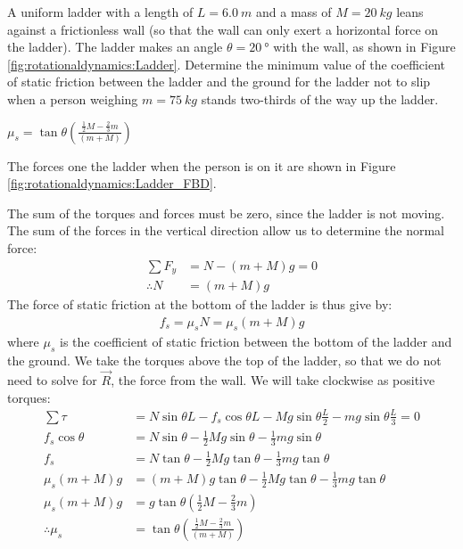 \question A uniform ladder with a length of $L=\SI{6.0}{m}$ and a mass of $M=\SI{20}{kg}$ leans against a frictionless wall (so that the wall can only exert a horizontal force on the ladder). The ladder makes an angle $\theta=\SI{20}{\degree}$ with the wall, as shown in Figure \ref{fig:rotationaldynamics:Ladder}. Determine the minimum value of the coefficient of static friction between the ladder and the ground for the ladder not to slip when a person weighing $m=\SI{75}{kg}$ stands two-thirds of the way up the ladder.
\begin{finalanswer}
$\mu_s =\tan\theta\left(\frac{\frac{1}{2}M-\frac{2}{3}m}{(m+M)}  \right)$
\end{finalanswer}
\begin{solution}
The forces one the ladder when the person is on it are shown in Figure \ref{fig:rotationaldynamics:Ladder_FBD}.

The sum of the torques and forces must be zero, since the ladder is not moving. The sum of the forces in the vertical direction allow us to determine the normal force:
\begin{align*}
\sum F_y&=N-(m+M)g=0\\
\therefore N&=(m+M)g
\end{align*}
The force of static friction at the bottom of the ladder is thus give by:
\begin{align*}
f_s=\mu_sN=\mu_s(m+M)g
\end{align*}
where $\mu_s$ is the coefficient of static friction between the bottom of the ladder and the ground. We take the torques above the top of the ladder, so that we do not need to solve for $\vec R$, the force from the wall. We will take clockwise as positive torques:
\begin{align*}
\sum\tau&=N\sin\theta L-f_s\cos\theta L-Mg\sin\theta\frac{L}{2}-mg\sin\theta\frac{L}{3}=0\\
f_s\cos\theta&=N\sin\theta-\frac{1}{2}Mg\sin\theta-\frac{1}{3}mg\sin\theta\\
f_s&=N\tan\theta-\frac{1}{2}Mg\tan\theta-\frac{1}{3}mg\tan\theta\\
\mu_s(m+M)g &=(m+M)g\tan\theta-\frac{1}{2}Mg\tan\theta-\frac{1}{3}mg\tan\theta\\
\mu_s(m+M)g &=g\tan\theta\left(\frac{1}{2}M-\frac{2}{3}m  \right) \\
\therefore \mu_s &=\tan\theta\left(\frac{\frac{1}{2}M-\frac{2}{3}m}{(m+M)}  \right) \\
\end{align*}
\end{solution}


